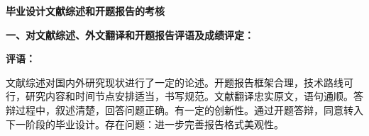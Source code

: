 \thispagestyle{empty}

{
	\setlength{\parindent}{0em}
	\renewcommand{\baselinestretch}{2}

	{
		\stfangsong\sanhao\bfseries
		\centering
		毕业设计文献综述和开题报告的考核 \par
	}

	{
		{\kaiti\sihao\bfseries
				一、对文献综述、外文翻译和开题报告评语及成绩评定：}

			{\songti\sihao \bfseries
				评语： \\
      }
      
      \vspace{2em}
      
      {\songti \xiaosi 文献综述对国内外研究现状进行了一定的论述。开题报告框架合理，技术路线可行，研究内容和时间节点安排适当，书写规范。文献翻译忠实原文，语句通顺。答辩过程中，叙述清楚，回答问题正确。有一定的创新性。通过开题答辩，同意转入下一阶段的毕业设计。存在问题：进一步完善报告格式美观性。}

		\vspace{12em}





	}

	\vspace{2em}

	{

}}
